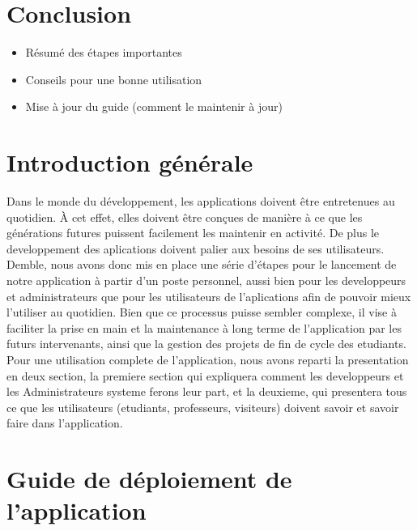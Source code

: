 \documentclass[12pt]{article}
\begin{document}
    \section*{Conclusion}
            \begin{itemize}[label=--]
            \item Résumé des étapes importantes
            \item Conseils pour une bonne utilisation
            \item Mise à jour du guide (comment le maintenir à jour)
        \end{itemize}
        \newpage
        \section*{Introduction générale}
            \noindent
            Dans le monde du développement, les applications doivent être entretenues au quotidien. 
            À cet effet, elles doivent être conçues de manière à ce que les générations futures puissent 
            facilement les maintenir en activité. De plus le developpement des aplications doivent palier
            aux besoins de ses utilisateurs. Demble, nous avons donc mis en place une série d'étapes pour 
            le lancement de notre application à partir d’un poste personnel, aussi bien pour les developpeurs 
            et administrateurs que pour les utilisateurs de l'aplications afin de pouvoir mieux l'utiliser
            au quotidien. Bien que ce processus puisse sembler complexe, il vise à faciliter la prise en
            main et la maintenance à long terme de l’application par les futurs intervenants, ainsi que la 
            gestion des projets de fin de cycle des etudiants. Pour une utilisation complete de l'application, 
            nous avons reparti la presentation en deux section, la premiere section qui expliquera comment
            les developpeurs et les Administrateurs systeme ferons leur part, et la deuxieme, qui presentera
            tous ce que les utilisateurs (etudiants, professeurs, visiteurs) doivent savoir et savoir faire 
            dans l'application.
            \vspace{0.5cm}
        \section{Guide de déploiement de l’application}
\end{document}
